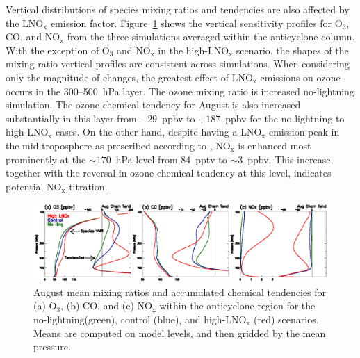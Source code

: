 Vertical distributions of species mixing ratios and tendencies are also affected by
the $\mathrm{LNO_x}$ emission factor. Figure~\ref{fig:ltng_vert} shows the vertical
sensitivity profiles for O$_3$, CO, and NO$_\mathrm{x}$ from the three simulations
averaged within the anticyclone column. With the exception of O$_3$ and
NO$_\mathrm{x}$ in the high-LNO$_{\mathrm{x}}$ scenario, the shapes of the mixing
ratio vertical profiles are consistent across simulations. When considering only
the magnitude of changes, the greatest effect of LNO$_\mathrm{x}$ emissions
on ozone occurs in the 300--500~hPa layer. The ozone mixing ratio is increased
no-lightning simulation. The ozone chemical tendency for August is also increased
substantially in this layer from $-29$~ppbv to $+187$~ppbv for the no-lightning to high-$\mathrm{LNO_x}$ cases.
On the other hand, despite having a LNO$_\mathrm{x}$
emission peak in the mid-troposphere as prescribed according to \citet{Ott:2010lo},
NO$_\mathrm{x}$ is enhanced most prominently at the $\sim170$~hPa level from
84~pptv to $\sim3$~ppbv. This increase, together with the reversal in ozone chemical
tendency at this level, indicates potential NO$_\mathrm{x}$-titration.

 \begin{figure}
 \noindent\includegraphics[width=40pc]{figures/ltngsens_vert.eps}
 \caption{August mean mixing ratios and accumulated chemical tendencies
for (a) O$_3$, (b) CO, and (c) NO$_{\mathrm{x}}$ within the anticyclone
region for the no-lightning(green), control (blue),
and high-LNO$_{\mathrm{x}}$ (red) scenarios. Means are computed on model levels, and then
gridded by the mean pressure.}
 \label{fig:ltng_vert}
 \end{figure}



